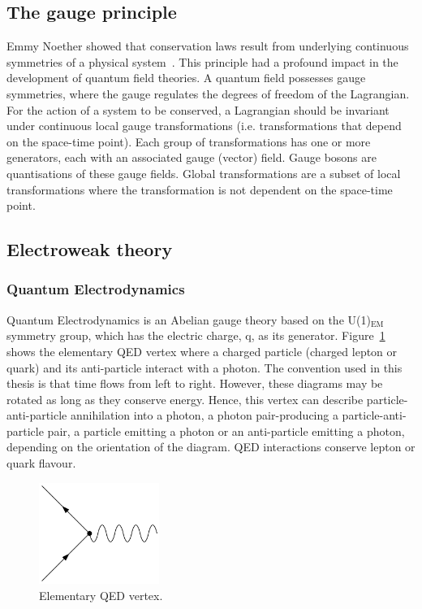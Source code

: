\subsection{The gauge principle}
Emmy Noether showed that conservation laws result from underlying continuous symmetries of a physical system~\cite{Emmy}. This principle had a profound impact in the development of quantum field theories. A quantum field possesses gauge symmetries, where the gauge regulates the degrees of freedom of the Lagrangian. For the action of a system to be conserved, a Lagrangian should be invariant under continuous local gauge transformations (i.e. transformations that depend on the space-time point). Each group of transformations has one or more generators, each with an associated gauge (vector) field. Gauge bosons are quantisations of these gauge fields. Global transformations are a subset of local transformations where the transformation is not dependent on the space-time point.

\subsection{Electroweak theory}

\subsubsection{Quantum Electrodynamics}
\label{subsec:QED}

Quantum Electrodynamics is an Abelian gauge theory based on the U(1)$_{\textrm{EM}}$ symmetry group, which has the electric charge, q, as its generator. Figure~\ref{fig:QEDvertex} shows the elementary QED vertex where a charged particle (charged lepton or quark) and its anti-particle interact with a photon. The convention used in this thesis is that time flows from left to right. However, these diagrams may be rotated as long as they conserve energy. Hence, this vertex can describe particle-anti-particle annihilation into a photon, a photon pair-producing a particle-anti-particle pair, a particle emitting a photon or an anti-particle emitting a photon, depending on the orientation of the diagram. QED interactions conserve lepton or quark flavour.


\begin{figure}[ht!]
\begin{center}
    \includegraphics[width=0.35\textwidth]{images/Theory/QEDvertex.png}
    \caption{Elementary QED vertex.}
    \label{fig:QEDvertex}
\end{center}
\end{figure}

